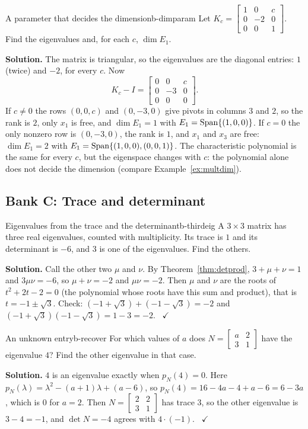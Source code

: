 \documentclass[11pt]{article}
\begin{document}
\begin{exmp}{A parameter that decides the dimension}{b-dimparam}
Let $K_c=\begin{bmatrix}1&0&c\\0&-2&0\\0&0&1\end{bmatrix}$. Find the eigenvalues and, for each $c$, $\dim E_1$.

\textbf{Solution.} The matrix is triangular, so the eigenvalues are the diagonal entries: $1$ (twice) and $-2$, for every $c$. Now
\[
K_c-I=\begin{bmatrix}0&0&c\\0&-3&0\\0&0&0\end{bmatrix}.
\]
If $c\neq0$ the rows $(0,0,c)$ and $(0,-3,0)$ give pivots in columns $3$ and $2$, so the rank is $2$, only $x_1$ is free, and $\dim E_1=1$ with $E_1=\operatorname{Span}\{(1,0,0)\}$. If $c=0$ the only nonzero row is $(0,-3,0)$, the rank is $1$, and $x_1$ and $x_3$ are free: $\dim E_1=2$ with $E_1=\operatorname{Span}\{(1,0,0),(0,0,1)\}$. The characteristic polynomial is the same for every $c$, but the eigenspace changes with $c$: the polynomial alone does not decide the dimension (compare Example~\ref{ex:multdim}).
\end{exmp}

\subsection*{Bank C: Trace and determinant}
\begin{exmp}{Eigenvalues from the trace and the determinant}{b-thirdeig}
A $3\times3$ matrix has three real eigenvalues, counted with multiplicity. Its trace is $1$ and its determinant is $-6$, and $3$ is one of the eigenvalues. Find the others.

\textbf{Solution.} Call the other two $\mu$ and $\nu$. By Theorem~\ref{thm:detprod}, $3+\mu+\nu=1$ and $3\mu\nu=-6$, so $\mu+\nu=-2$ and $\mu\nu=-2$. Then $\mu$ and $\nu$ are the roots of $t^2+2t-2=0$ (the polynomial whose roots have this sum and product), that is $t=-1\pm\sqrt3$. Check: $(-1+\sqrt3)+(-1-\sqrt3)=-2$ and $(-1+\sqrt3)(-1-\sqrt3)=1-3=-2$. \ $\checkmark$
\end{exmp}

\begin{exmp}{An unknown entry}{b-recover}
For which values of $a$ does $N=\begin{bmatrix}a&2\\3&1\end{bmatrix}$ have the eigenvalue $4$? Find the other eigenvalue in that case.

\textbf{Solution.} $4$ is an eigenvalue exactly when $p_N(4)=0$. Here $p_N(\lambda)=\lambda^2-(a+1)\lambda+(a-6)$, so $p_N(4)=16-4a-4+a-6=6-3a$, which is $0$ for $a=2$. Then $N=\begin{bmatrix}2&2\\3&1\end{bmatrix}$ has trace $3$, so the other eigenvalue is $3-4=-1$, and $\det N=-4$ agrees with $4\cdot(-1)$. \ $\checkmark$
\end{exmp}
\end{document}

